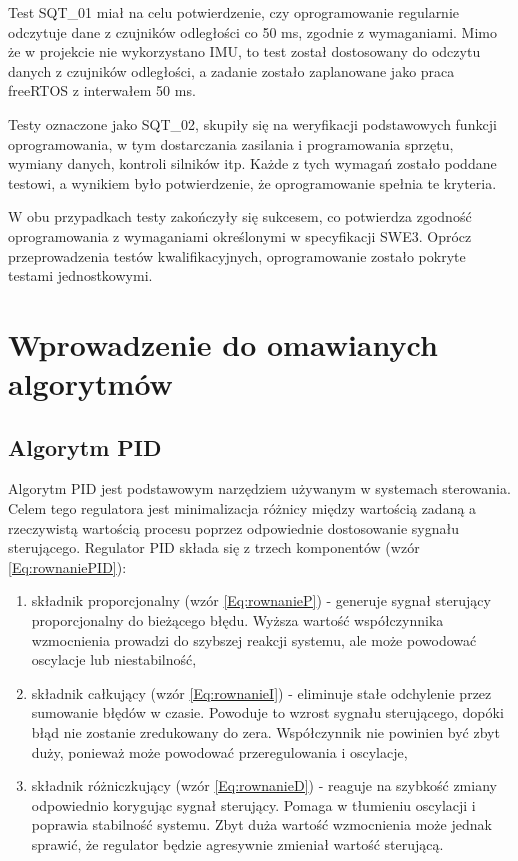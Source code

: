 \documentclass[12pt,twoside]{article}
\begin{document}
Test SQT\_01 miał na celu potwierdzenie, czy oprogramowanie regularnie odczytuje dane z czujników odległości co 50 ms, zgodnie z wymaganiami. Mimo że w projekcie nie wykorzystano IMU, to test został dostosowany do odczytu danych z czujników odległości, a zadanie zostało zaplanowane jako praca freeRTOS z interwałem 50 ms.

Testy oznaczone jako SQT\_02, skupiły się na weryfikacji podstawowych funkcji oprogramowania, w tym dostarczania zasilania i programowania sprzętu, wymiany danych, kontroli silników itp. Każde z tych wymagań zostało poddane testowi, a wynikiem było potwierdzenie, że oprogramowanie spełnia te kryteria.

W obu przypadkach testy zakończyły się sukcesem, co potwierdza zgodność oprogramowania z wymaganiami określonymi w specyfikacji SWE3. Oprócz przeprowadzenia testów kwalifikacyjnych, oprogramowanie zostało pokryte testami jednostkowymi.

\section{Wprowadzenie do omawianych algorytmów}

\subsection{Algorytm PID}
Algorytm PID \cite{PID} jest podstawowym narzędziem używanym w systemach sterowania. Celem tego regulatora jest minimalizacja różnicy między wartością zadaną a rzeczywistą wartością procesu poprzez odpowiednie dostosowanie sygnału sterującego. Regulator PID składa się z trzech komponentów (wzór \ref{Eq:rownaniePID}):



\begin{enumerate}[label=\alph*), leftmargin=1.25cm]
	\item składnik proporcjonalny (wzór \ref{Eq:rownanieP}) - generuje sygnał sterujący proporcjonalny do bieżącego błędu. Wyższa wartość współczynnika wzmocnienia prowadzi do szybszej reakcji systemu, ale może powodować oscylacje lub niestabilność,
	
	\item składnik całkujący (wzór \ref{Eq:rownanieI}) - eliminuje stałe odchylenie przez sumowanie błędów w czasie. Powoduje to wzrost sygnału sterującego, dopóki błąd nie zostanie zredukowany do zera. Współczynnik nie powinien być zbyt duży, ponieważ może powodować przeregulowania i oscylacje,
	
	\item składnik różniczkujący (wzór \ref{Eq:rownanieD}) - reaguje na szybkość zmiany odpowiednio korygując sygnał sterujący. Pomaga w tłumieniu oscylacji i poprawia stabilność systemu. Zbyt duża wartość wzmocnienia może jednak sprawić, że regulator będzie agresywnie zmieniał wartość sterującą.
\end{enumerate}
\end{document}
